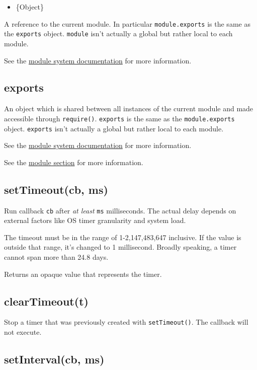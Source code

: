 \begin{itemize}
\item
  \{Object\}
\end{itemize}

A reference to the current module. In particular \texttt{module.exports}
is the same as the \texttt{exports} object. \texttt{module} isn't
actually a global but rather local to each module.

See the \href{modules.html}{module system documentation} for more
information.

\subsection{exports}

An object which is shared between all instances of the current module
and made accessible through \texttt{require()}. \texttt{exports} is the
same as the \texttt{module.exports} object. \texttt{exports} isn't
actually a global but rather local to each module.

See the \href{modules.html}{module system documentation} for more
information.

See the \href{modules.html}{module section} for more information.

\subsection{setTimeout(cb, ms)}

Run callback \texttt{cb} after \emph{at least} \texttt{ms} milliseconds.
The actual delay depends on external factors like OS timer granularity
and system load.

The timeout must be in the range of 1-2,147,483,647 inclusive. If the
value is outside that range, it's changed to 1 millisecond. Broadly
speaking, a timer cannot span more than 24.8 days.

Returns an opaque value that represents the timer.

\subsection{clearTimeout(t)}

Stop a timer that was previously created with \texttt{setTimeout()}. The
callback will not execute.

\subsection{setInterval(cb, ms)}

